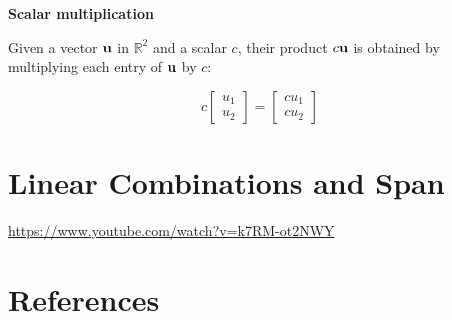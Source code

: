 \documentclass[
  letterpaper,
  DIV=11,
  numbers=noendperiod]{scrreprt}
\newlength{\cslhangindent}
\newlength{\cslentryspacingunit} %
\newenvironment{CSLReferences}[2] %
 {%
  \setlength{\parindent}{0pt}
  \ifodd #1
  \let\oldpar\par
  \def\par{\hangindent=\cslhangindent\oldpar}
  \fi
  \setlength{\parskip}{#2\cslentryspacingunit}
 }%
 {}
\begin{document}
\textbf{Scalar multiplication}

Given a vector \(\bf{u}\) in \(\mathbb{R}^2\) and a scalar \(c\), their
product \(c\bf{u}\) is obtained by multiplying each entry of \(\bf{u}\)
by \(c\):

\[
c
\begin{bmatrix}
u_1 \\
u_2
\end{bmatrix}
=
\begin{bmatrix}
cu_1 \\
cu_2
\end{bmatrix}
\]


\hypertarget{linear-combinations-and-span}{%
\chapter{Linear Combinations and
Span}\label{linear-combinations-and-span}}

\url{https://www.youtube.com/watch?v=k7RM-ot2NWY}


\hypertarget{references}{%
\chapter*{References}\label{references}}


\hypertarget{refs}{}
\begin{CSLReferences}{0}{0}
\end{CSLReferences}
\end{document}
